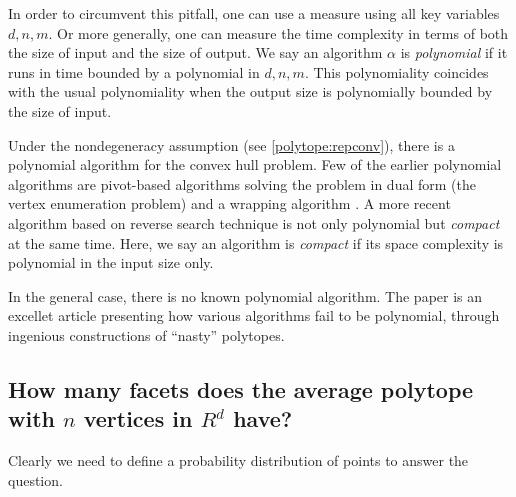 \documentclass[a4paper,12pt]{article}
\begin{document}
In order to circumvent this pitfall, one can use a measure using
all key variables $d, n, m$.   Or more generally, one can
measure the time complexity in terms of both the size of
input and the size of output.
  We say an algorithm $\alpha$ is {\em polynomial\/}
if it runs in time bounded by a polynomial in $d, n, m$.
This polynomiality coincides with the usual polynomiality
when the output size is polynomially bounded by the size of
input.

Under the nondegeneracy assumption (see \ref{polytope:repconv}),
there is a polynomial algorithm for the convex hull problem.
Few of the earlier polynomial algorithms are pivot-based
algorithms \cite{cch-itlp-53,d-cvem-83}
solving the problem in dual form (the vertex enumeration problem)
and a wrapping algorithm \cite{ck-acp-70}.
A more recent algorithm \cite{af-pachv-92} based on reverse search technique
\cite{af-rse-96} is not only polynomial but {\em compact\/} at 
the same time.  Here, we say an algorithm is {\em compact\/} if its
space complexity is polynomial in the input size only.

In the general case, there is no known polynomial algorithm.
The paper \cite{abs-hgach-97} is an excellet article presenting
how various algorithms fail to be polynomial, through ingenious
constructions of ``nasty'' polytopes.

\subsection{How many facets does the average polytope with $n$ vertices in
$R^d$ have?}
\label{polytope:expectedHcomplexity}

Clearly we need to define a probability distribution of
points to answer the question.
\end{document}

